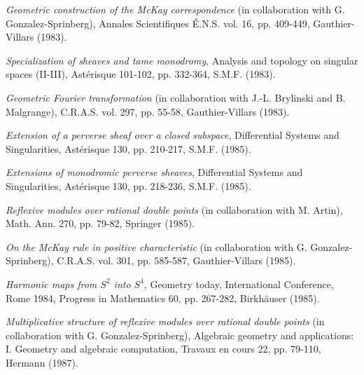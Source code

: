 \begin{description}
\item[{[37]}] \emph{Geometric construction of the McKay correspondence}
(in collaboration with G. Gonzalez-Sprinberg), Annales Scientifiques É.N.S.
vol. 16, pp. 409-449, Gauthier-Villars (1983).

\item[{[38]}] \emph{Specialization of sheaves and tame monodromy}, Analysis
and topology on singular spaces (II-III), Astérisque 101-102, pp. 332-364,
S.M.F. (1983).

\item[{[39]}] \emph{Geometric Fourier transformation} (in collaboration with
J.-L. Brylinski and B. Malgrange), C.R.A.S. vol. 297, pp. 55-58,
Gauthier-Villars (1983).

\item[{[40]}] \emph{Extension of a perverse sheaf over a closed subspace},
Differential Systems and Singularities, Astérisque 130, pp. 210-217,
S.M.F. (1985).

\item[{[41]}] \emph{Extensions of monodromic perverse sheaves}, Differential
Systems and Singularities, Astérisque 130, pp. 218-236, S.M.F. (1985).

\item[{[42]}] \emph{Reflexive modules over rational double points}
(in collaboration with M. Artin), Math. Ann. 270, pp. 79-82,
Springer (1985).

\item[{[43]}] \emph{On the McKay rule in positive characteristic}
(in collaboration with G. Gonzalez-Sprinberg), C.R.A.S. vol. 301,
pp. 585-587, Gauthier-Villars (1985).

\item[{[44]}] \emph{Harmonic maps from $S^2$ into $S^4$}, Geometry today,
International Conference, Rome 1984, Progress in Mathematics 60,
pp. 267-282, Birkhäuser (1985).

\item[{[45]}] \emph{Multiplicative structure of reflexive modules over
rational double points} (in collaboration with G. Gonzalez-Sprinberg),
Algebraic geometry and applications: I. Geometry and algebraic computation,
Travaux en cours 22, pp. 79-110, Hermann (1987).


\end{description}
